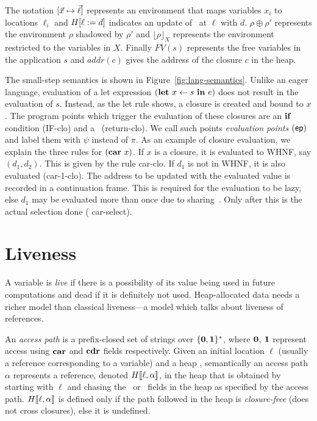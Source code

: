 \documentclass[9pt,nonatbib]{sigplanconf}
\def\myvec{\mathaccent"017E }
\begin{document}
The   notation  $[\myvec{x}   \mapsto  \myvec{\ell}]$   represents  an
environment  that  maps  variables  $x_i$ to  locations  $\ell_i$  and
$H[\ell := d]$  indicates an update of  \heap\ at $\ell$
with  $d$.   $\rho \oplus  \rho'$  represents  the environment  $\rho$
shadowed  by  $\rho'$  and  $\lfloor \rho  \rfloor_X$  represents  the
environment  restricted  to  the  variables in  $X$.  Finally  $FV(s)$
represents the  free variables  in the  application $s$  and $addr(c)$
gives the address of the closure $c$ in the heap.

The small-step semantics  is shown in Figure~\ref{fig:lang-semantics}.
Unlike   an   eager  language,   evaluation   of   a  let   expression
$(\mbox{$\mathbf{ let}$}~x\leftarrow  s~\mbox{$\mathbf{ in}$}~e)$ does  not  result in  the evaluation  of
$s$. Instead,  as the {\sc let}  rule shows, a closure  is created and
bound to  $x$. The  program points which  trigger the evaluation  of these
closures   are  an $\mbox{$\mathbf{ if}$}$   condition ({\sc  IF-clo})   and
 a \SRETURN\ ({\sc  return-clo}).  We  call such  points \emph{evaluation
  points   $(\mathsf{ep})$}  and   label  them   with  $\psi$   instead  of
$\pi$. As an  example of closure  evaluation, we  explain the
three rules for  $(\mbox{$\mathbf{car}$}~x)$.  If $x$ is a closure,  it is evaluated to
WHNF, say $(d_1, d_2)$.  This is  given by the rule {\sc car-clo}.  If
$d_1$ is  not in WHNF,  it is  also evaluated ({\sc  car-1-clo}).  The
address  to be  updated  with the  evaluated value  is
recorded  in  a  continuation  frame.    This  is  required  for the
evaluation  to be lazy, else $d_1$ may  be evaluated more than once
due to  sharing~\cite{Jones87}.  Only after this  is the actual selection  done ({\sc
  car-select}).


\section{Liveness}
\label{sec:liveness}


A variable is {\em live} if there  is a possibility of its value being
used in  future computations and  dead if  it is definitely  not used.
Heap-allocated data  needs a richer model  than classical liveness---a
model which talks about liveness of references.  



An {\em access path}
is a  prefix-closed set of strings  over $\{\mathbf{0},\mathbf{1}\}^\ast$, where
$\mathbf{0}$,  $\mathbf{1}$ represent  access  using $\mbox{$\mathbf{car}$}$  and $\mbox{$\mathbf{cdr}$}$  fields respectively.
Given an initial location $\ell$ (usually a reference corresponding to
a variable)  and a  heap \heap, semantically  an access  path $\alpha$
represents     a      reference,     denoted     $H\llbracket\ell,
\alpha\rrbracket$,  in the  heap  that is  obtained  by starting  with
$\ell$ and chasing the \CAR\ or  \CDR\ fields in the heap as specified
by  the  access   path.   $H\llbracket\ell,  \alpha\rrbracket$  is
defined only if  the path followed in the  heap is \emph{closure-free}
(does not cross closures), else it is undefined.
\end{document}
